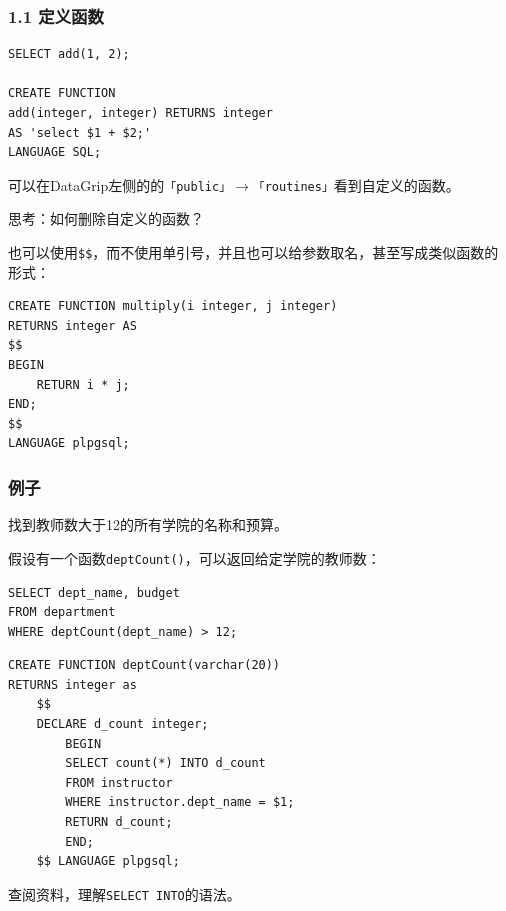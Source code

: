 \documentclass[aspectratio=169, 14pt]{beamer}
\begin{document}
\begin{frame}[fragile]
    \frametitle{1.1 定义函数}

    \begin{verbatim}
SELECT add(1, 2);

CREATE FUNCTION
add(integer, integer) RETURNS integer
AS 'select $1 + $2;'
LANGUAGE SQL;
    \end{verbatim}

可以在DataGrip左侧的的\texttt{「public」}$\rightarrow$\alert{\texttt{「routines」}}看到自定义的函数。

思考：如何删除自定义的函数？
\end{frame}


\begin{frame}[fragile]
也可以使用\alert{\texttt{\$\$}}，而不使用单引号，并且也可以给参数取名，甚至写成类似函数的形式：

\begin{verbatim}
CREATE FUNCTION multiply(i integer, j integer)
RETURNS integer AS
$$
BEGIN
    RETURN i * j;
END;
$$
LANGUAGE plpgsql;
\end{verbatim}

\end{frame}

\begin{frame}[fragile]
    \frametitle{例子}
找到教师数大于12的所有学院的名称和预算。

\pause

假设有一个函数\alert{\texttt{deptCount()}}，可以返回给定学院的教师数：

\begin{verbatim}
SELECT dept_name, budget
FROM department
WHERE deptCount(dept_name) > 12;
\end{verbatim}
\end{frame}

\begin{frame}[fragile]
    \begin{verbatim}
CREATE FUNCTION deptCount(varchar(20))
RETURNS integer as
    $$
    DECLARE d_count integer;
        BEGIN
        SELECT count(*) INTO d_count
        FROM instructor
        WHERE instructor.dept_name = $1;
        RETURN d_count;
        END;
    $$ LANGUAGE plpgsql;
    \end{verbatim}

 查阅资料，理解\texttt{SELECT INTO}的语法。
\end{frame}
\end{document}
